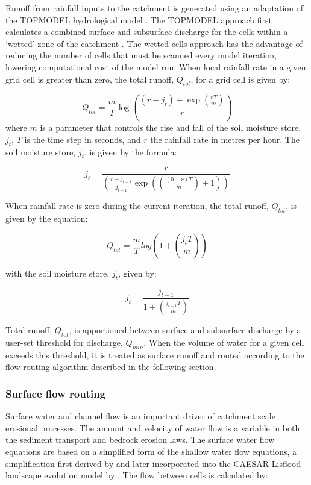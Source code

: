 Runoff from rainfall inputs to the catchment is generated using an adaptation of the TOPMODEL hydrological model \citep{beven1979physically}. The TOPMODEL approach first calculates a combined surface and subsurface discharge for the cells within a `wetted' zone of the catchment \citep{coulthard2002cellular}. The wetted cells approach has the advantage of reducing the number of cells that must be scanned every model iteration, lowering computational cost of the model run. When local rainfall rate in a given grid cell is greater than zero, the total runoff, \(Q_{tot}\), for a grid cell is given by: 

\begin{equation}
Q_{tot} = \frac{m}{T} \log \left( \frac{(r-j_t) + \exp \left(\frac{rT}{m} \right)}{r} \right)
\end{equation}
where \(m\) is a parameter that controls the rise and fall of the soil moisture store, \(j_t\), \(T\) is the time step in seconds, and \(r\) the rainfall rate in metres per hour. The soil moisture store, \(j_t\), is given by the formula:

\begin{equation}
j_t = \frac{r}  { \left(  \frac{r-j_{t-1}}{j_{t-1}  } \exp \left( \left( \frac{(0-r)T}{m}\right) +1 \right) \right)}
\end{equation}

\noindent
When rainfall rate is zero during the current iteration, the total runoff, \(Q_{tot}\), is given by the equation:

\begin{equation}
Q_{tot} =  \frac{m}{T} log \left( 1 + \left( \frac{j_t  T}{m} \right) \right)
\end{equation}

\noindent
with the soil moisture store, \(j_t\), given by:

\begin{equation}
j_t = \frac{j_{t-1}}{1 + \left( \frac{j_{t-1}T}{m} \right) }
\end{equation}

\noindent
Total runoff, \(Q_{tot}\), is apportioned between surface and subsurface discharge by a user-set threshold for discharge, \(Q_{min}\). When the volume of water for a given cell exceeds this threshold, it is treated as surface runoff and routed according to the flow routing algorithm described in the following section.

%

\subsubsection{Surface flow routing}
Surface water and channel flow is an important driver of catchment scale erosional processes. The amount and velocity of water flow is a variable in both the sediment transport and bedrock erosion laws. The surface water flow equations are based on a simplified form of the shallow water flow equations, a simplification first derived by \citet{bates2010simple} and later incorporated into the CAESAR-Lisflood landscape evolution model by \citet{Coulthard2013}. The flow between cells is calculated by:

